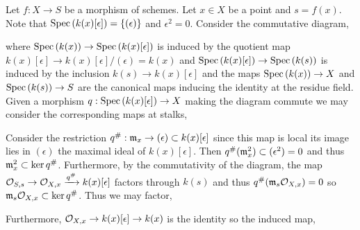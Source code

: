 \documentclass[12pt]{article}
\begin{document}
Let $f : X \to S$ be a morphism of schemes. Let $x \in X$ be a point and $s = f(x)$. Note that $\mathrm{Spec}\left( k(x)[\epsilon] \right) = \{ (\epsilon) \}$ and $\epsilon^2 = 0$. Consider the commutative diagram,
\begin{center}
\end{center}
where $\mathrm{Spec}\left( k(x) \right) \to \mathrm{Spec}\left( k(x)[\epsilon] \right)$ is induced by the quotient map $k(x)[\epsilon] \to k(x)[\epsilon]/(\epsilon) = k(x)$ and $\mathrm{Spec}\left( k(x)[\epsilon] \right) \to \mathrm{Spec}\left( k(s) \right)$ is induced by the inclusion $k(s) \to k(x)[\epsilon]$ and the maps $\mathrm{Spec}\left( k(x) \right) \to X$ and $\mathrm{Spec}\left( k(s) \right) \to S$ are the canonical maps inducing the identity at the residue field. 
\bigskip\\
Given a morphism $q : \mathrm{Spec}\left( k(x)[\epsilon] \right) \to X$ making the diagram commute we may consider the corresponding maps at stalks,
\begin{center}
\end{center}
Consider the restriction $q^\# : \mathfrak{m}_x \to (\epsilon) \subset k(x)[\epsilon]$ since this map is local its image lies in $(\epsilon)$ the maximal ideal of $k(x)[\epsilon]$. Then $q^\#(\mathfrak{m}_x^2) \subset (\epsilon^2) = 0$ and thus $\mathfrak{m}_x^2 \subset \ker{q^\#}$. Furthermore, by the commutativity of the diagram, the map $\mathcal{O}_{S, s} \to \mathcal{O}_{X, x} \xrightarrow{q^\#} k(x)[\epsilon]$ factors through $k(s)$ and thus $q^\#(\mathfrak{m}_s \mathcal{O}_{X, x}) = 0$ so $\mathfrak{m}_s \mathcal{O}_{X, x} \subset \ker{q^\#}$. Thus we may factor,
\begin{center}
\end{center} 
Furthermore, $\mathcal{O}_{X, x} \to k(x)[\epsilon] \to k(x)$ is the identity so the induced map,
\end{document}
